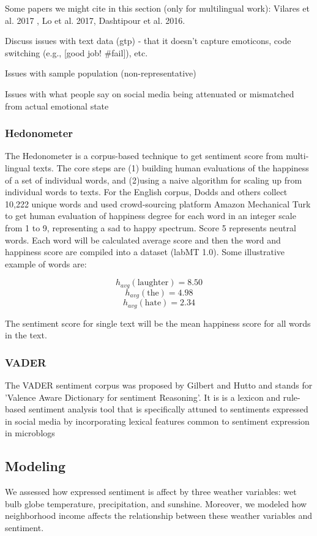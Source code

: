 \documentclass{article}
\begin{document}
Some papers we might cite in this section (only for multilingual work): Vilares et al. 2017 , Lo et al. 2017, Dashtipour et al. 2016.

Discuss issues with text data (gtp) - that it doesn’t capture emoticons, code switching (e.g., [good job! \#fail]), etc.

Issues with sample population (non-representative)

Issues with what people say on social media being attenuated or mismatched from actual emotional state

\subsubsection{Hedonometer}
The Hedonometer \cite{dodds_temporal_2011} is a corpus-based technique to get sentiment score from multi-lingual texts. The core steps are (1) building human evaluations of the happiness of a set of individual words, and (2)using a naive algorithm for scaling up from individual words to texts. For the English corpus, Dodds and others \cite{dodds_temporal_2011} collect 10,222 unique words and used crowd-sourcing platform Amazon Mechanical Turk to get human evaluation of happiness degree for each word in an integer scale from 1 to 9, representing a sad to happy spectrum. Score 5 represents neutral words. Each word will be calculated average score and then the word and happiness score are compiled into a dataset (labMT 1.0). Some illustrative example of words are: 

\[h_{avg} (\text{laughter}) = 8.50 \]
\[h_{avg} (\text{the}) = 4.98\]
\[h_{avg} (\text{hate}) = 2.34\]

The sentiment score for single text will be the mean happiness score for all words in the text.


\subsubsection{VADER}
The VADER sentiment corpus was proposed by Gilbert and Hutto \cite{gilbert_vader_2014} and stands for 'Valence Aware Dictionary for sentiment Reasoning'. It is is a lexicon and rule-based sentiment analysis tool that is specifically attuned to sentiments expressed in social media by incorporating lexical features common to sentiment expression in microblogs

\subsection{Modeling}
We assessed how expressed sentiment is affect by three weather variables: wet bulb globe temperature, precipitation, and sunshine.  Moreover, we modeled how neighborhood income affects the relationship between these weather variables and sentiment.
\end{document}
